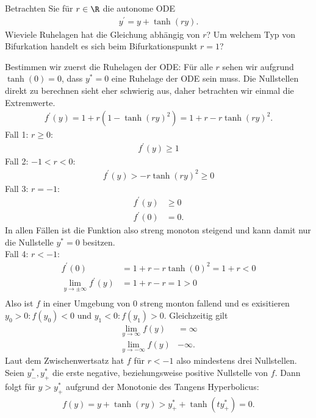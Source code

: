 \begin{exercise}
Betrachten Sie für $r \in \R$ die autonome ODE
\begin{align*}
  y^{\prime} = y + \tanh(ry).
\end{align*}
Wieviele Ruhelagen hat die Gleichung abhängig von $r$? Um welchem Typ von Bifurkation
handelt es sich beim Bifurkationspunkt $r = 1$?
\end{exercise}
\begin{solution}
Bestimmen wir zuerst die Ruhelagen der ODE:
Für alle $r$ sehen wir aufgrund $\tanh(0) = 0$, dass $y^* = 0$ eine Ruhelage der ODE
sein muss.
Die Nullstellen direkt zu berechnen sieht eher schwierig aus, daher betrachten wir
einmal die Extremwerte.
\begin{align*}
  f^{\prime}(y) = 1 + r(1 - \tanh(ry)^2) = 1 + r - r\tanh(ry)^2.
\end{align*}
Fall 1: $r \geq 0:$
\begin{align*}
  f^{\prime}(y) \geq 1
\end{align*}
Fall 2: $-1 < r < 0$:
\begin{align*}
  f^{\prime}(y) > -r\tanh(ry)^2 \geq 0
\end{align*}
Fall 3: $r = -1$:
\begin{align*}
  f^{\prime}(y) &\geq 0 \\
  f^{\prime}(0) &= 0.
\end{align*}
In allen Fällen ist die Funktion also streng monoton steigend und kann damit
nur die Nullstelle $y^* = 0$ besitzen. \\
Fall 4: $r < -1$:
\begin{align*}
  f^{\prime}(0) &= 1 + r - r\tanh(0)^2 = 1 + r < 0 \\
  \lim_{y \to \pm\infty}f^{\prime}(y) &= 1 + r - r = 1 > 0 \\
\end{align*}
Also ist $f$ in einer Umgebung von $0$ streng monton fallend und es exisitieren
$y_0 > 0: f(y_0) < 0$ und $y_1 < 0: f(y_1) > 0$. Gleichzeitig gilt
\begin{align*}
  \lim_{y \to \infty} f(y) &= \infty \\
  \lim_{y \to -\infty} f(y) & -\infty.
\end{align*}
Laut dem Zwischenwertsatz hat $f$ für $r < -1$ also mindestens drei Nullstellen.
Seien $y_-^*,y_+^*$ die erste negative, beziehungsweise positive Nullstelle von $f$.
Dann folgt für $y > y_+^*$ aufgrund der Monotonie des Tangens Hyperbolicus:
\begin{align*}
  f(y) = y + \tanh(ry) > y_+^* + \tanh(ty_+^*) = 0.

\end{align*}
\end{solution}
